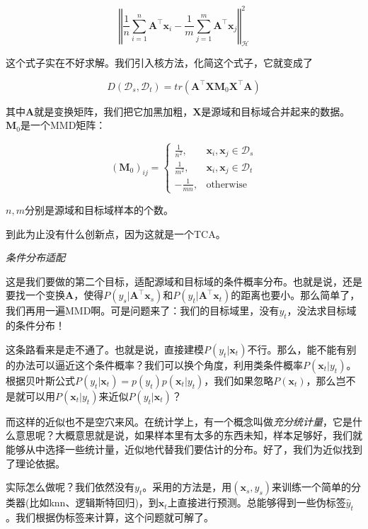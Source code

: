 \begin{equation}
	\left \Vert \frac{1}{n} \sum_{i=1}^{n} \mathbf{A}^\top \mathbf{x}_{i} - \frac{1}{m} \sum_{j=1}^{m} \mathbf{A}^\top \mathbf{x}_{j} \right \Vert ^2_\mathcal{H}
\end{equation}

这个式子实在不好求解。我们引入核方法，化简这个式子，它就变成了

\begin{equation}
	D(\mathcal{D}_s,\mathcal{D}_t)=tr(\mathbf{A}^\top \mathbf{X} \mathbf{M}_0 \mathbf{X}^\top \mathbf{A})
\end{equation}

其中$\mathbf{A}$就是变换矩阵，我们把它加黑加粗，$\mathbf{X}$是源域和目标域合并起来的数据。$\mathbf{M}_0$是一个MMD矩阵：

\begin{equation}
	(\mathbf{M}_0)_{ij}=\begin{cases} \frac{1}{n^2}, & \mathbf{x}_i,\mathbf{x}_j \in \mathcal{D}_s\\ \frac{1}{m^2}, & \mathbf{x}_i,\mathbf{x}_j \in \mathcal{D}_t\\ -\frac{1}{mn}, & \text{otherwise} \end{cases}
\end{equation}

$n,m$分别是源域和目标域样本的个数。

到此为止没有什么创新点，因为这就是一个TCA。

\textit{条件分布适配}

这是我们要做的第二个目标，适配源域和目标域的条件概率分布。也就是说，还是要找一个变换$\mathbf{A}$，使得$P(y_s|\mathbf{A}^\top \mathbf{x}_s)$和$P(y_t|\mathbf{A}^\top \mathbf{x}_t)$的距离也要小。那么简单了，我们再用一遍MMD啊。可是问题来了：我们的目标域里，没有$y_t$，没法求目标域的条件分布！

这条路看来是走不通了。也就是说，直接建模$P(y_t|\mathbf{x}_t)$不行。那么，能不能有别的办法可以逼近这个条件概率？我们可以换个角度，利用类条件概率$P(\mathbf{x}_t|y_t)$。根据贝叶斯公式$P(y_t|\mathbf{x}_t)=p(y_t)p(\mathbf{x}_t|y_t)$，我们如果忽略$P(\mathbf{x}_t)$，那么岂不是就可以用$P(\mathbf{x}_t|y_t)$来近似$P(y_t|\mathbf{x}_t)$？

而这样的近似也不是空穴来风。在统计学上，有一个概念叫做\textit{充分统计量}，它是什么意思呢？大概意思就是说，如果样本里有太多的东西未知，样本足够好，我们就能够从中选择一些统计量，近似地代替我们要估计的分布。好了，我们为近似找到了理论依据。

实际怎么做呢？我们依然没有$y_t$。采用的方法是，用$(\mathbf{x}_s,y_s)$来训练一个简单的分类器(比如knn、逻辑斯特回归)，到$\mathbf{x}_t$上直接进行预测。总能够得到一些伪标签$\hat{y}_t$。我们根据伪标签来计算，这个问题就可解了。

